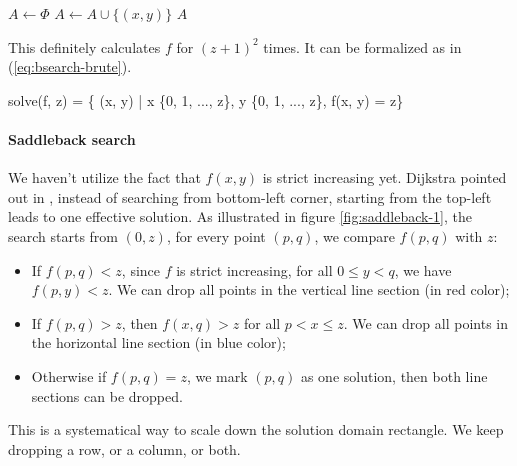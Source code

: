 \documentclass[UTF8]{article}
\begin{document}
\begin{algorithmic}[1]
  \State $A \gets \Phi$
        \State $A \gets A \cup \{(x, y)\}$
      \EndIf
    \EndFor
  \EndFor
  \State \Return $A$
\EndFunction
\end{algorithmic}

This definitely calculates $f$ for $(z+1)^2$ times. It can be formalized as in (\ref{eq:bsearch-brute}).

\be
solve(f, z) = \{ (x, y) | x \in \{0, 1, ..., z\}, y \in \{0, 1, ..., z\}, f(x, y) = z\}
\label{eq:bsearch-brute}
\ee

\paragraph{Saddleback search}

We haven't utilize the fact that $f(x, y)$ is strict increasing yet. Dijkstra pointed out in \cite{saddle-back}, instead
of searching from bottom-left corner, starting from the top-left leads to one effective solution. As illustrated in figure
\ref{fig:saddleback-1}, the search starts from $(0, z)$, for every point $(p, q)$, we compare $f(p, q)$ with $z$:

\begin{itemize}
\item If $f(p, q) < z$, since $f$ is strict increasing, for all $0 \leq y < q$, we have $f(p, y) < z$. We can drop all
points in the vertical line section (in red color);
\item If $f(p, q) > z$, then $f(x, q) > z$ for all $p < x \leq z$. We can drop all points in the horizontal
line section (in blue color);
\item Otherwise if $f(p, q) = z$, we mark $(p, q)$ as one solution, then both line sections can be dropped.
\end{itemize}

This is a systematical way to scale down the solution
domain rectangle. We keep dropping a row, or a column, or both.
\end{document}
